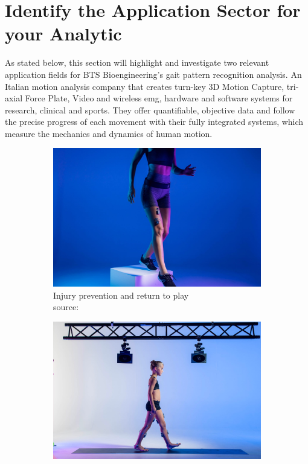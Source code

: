 \chapter{Identify the Application Sector for your Analytic}

As stated below, this section will highlight and investigate two relevant application fields for BTS Bioengineering's gait pattern recognition analysis. An Italian motion analysis company that creates turn-key 3D Motion Capture, tri-axial Force Plate, Video and wireless \ac{emg}, hardware and software systems for research, clinical and sports. They offer quantifiable, objective data and follow the precise progress of each movement with their fully integrated systems, which measure the mechanics and dynamics of human motion.

\begin{figure}[h]
     \centering
     \begin{subfigure}[b]{0.49\textwidth}
         \centering
         \includegraphics[scale=0.1]{Images/Injury prevention and return to play.jpeg}
         \captionsetup{justification=centering}
         \caption{Injury prevention and return to play \\ source: \cite{BTS_Injury_prevention2022}}
         \label{fig:Injury prevention and return to play}
     \end{subfigure}
     \hfill
     \begin{subfigure}[b]{0.49\textwidth}
         \centering
         \includegraphics[scale=0.1]{Images/Evaluation and treatment of Cerebral Palsy children.jpeg}

\end{subfigure}
\end{figure}
